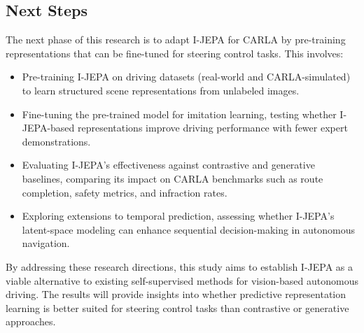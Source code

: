 \documentclass{article}
\begin{document}
\subsection{Next Steps}
The next phase of this research is to adapt I-JEPA for CARLA by pre-training representations that can be fine-tuned for steering control tasks. This involves:

\begin{itemize}
    \item Pre-training I-JEPA on driving datasets (real-world and CARLA-simulated) to learn structured scene representations from unlabeled images.
    \item Fine-tuning the pre-trained model for imitation learning, testing whether I-JEPA-based representations improve driving performance with fewer expert demonstrations.
    \item Evaluating I-JEPA’s effectiveness against contrastive and generative baselines, comparing its impact on CARLA benchmarks such as route completion, safety metrics, and infraction rates.
    \item Exploring extensions to temporal prediction, assessing whether I-JEPA’s latent-space modeling can enhance sequential decision-making in autonomous navigation.
\end{itemize}

By addressing these research directions, this study aims to establish I-JEPA as a viable alternative to existing self-supervised methods for vision-based autonomous driving. The results will provide insights into whether predictive representation learning is better suited for steering control tasks than contrastive or generative approaches.



\end{document}
